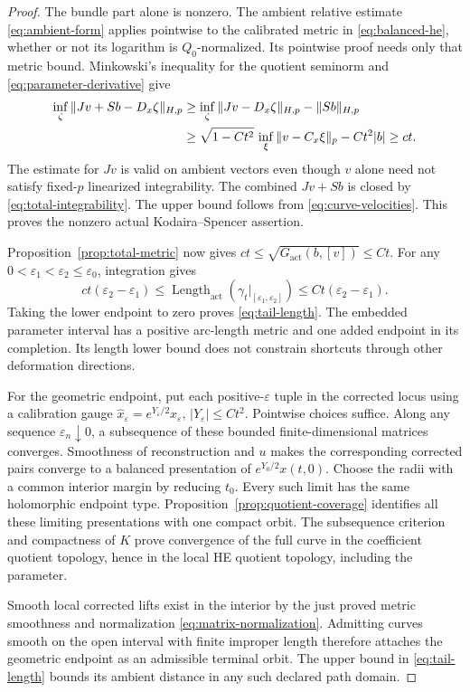 \documentclass[11pt]{amsart}
\theoremstyle{definition}
\theoremstyle{remark}
\begin{document}
\begin{proof}
The bundle part alone is nonzero. The ambient relative estimate
\eqref{eq:ambient-form} applies pointwise to the calibrated metric
in \eqref{eq:balanced-he}, whether or not its logarithm is
$Q_0$-normalized. Its pointwise proof needs only that metric bound.
Minkowski's inequality for the quotient seminorm and
\eqref{eq:parameter-derivative} give
\begin{align}
 \inf_\zeta\|Jv+Sb-D_x\zeta\|_{H,p}
 &\ge \inf_\zeta\|Jv-D_x\zeta\|_{H,p}-\|Sb\|_{H,p}\notag\\
 &\ge\sqrt{1-Ct^2}\,
       \inf_\xi\|v-C_x\xi\|_p-Ct^2|b|\ge ct.
 \label{eq:curve-ks-lower}
\end{align}
The estimate for $Jv$ is valid on ambient vectors even though $v$
alone need not satisfy fixed-$p$ linearized integrability. The combined
$Jv+Sb$ is closed by \eqref{eq:total-integrability}. The upper
bound follows from \eqref{eq:curve-velocities}. This proves the
nonzero actual Kodaira--Spencer assertion.

Proposition~\ref{prop:total-metric} now gives
$ct\le\sqrt{G_{\mathrm{act}}(b,[v])}\le Ct$.
For any $0<\varepsilon_1<\varepsilon_2\le\varepsilon_0$, integration
gives
\[
 ct(\varepsilon_2-\varepsilon_1)
 \le\operatorname{Length}_{\mathrm{act}}
       (\gamma_t|_{[\varepsilon_1,\varepsilon_2]})
 \le Ct(\varepsilon_2-\varepsilon_1).
\]
Taking the lower endpoint to zero proves \eqref{eq:tail-length}.
The embedded parameter interval has a positive arc-length metric and
one added endpoint in its completion. Its length lower bound does
not constrain shortcuts through other deformation directions.

For the geometric endpoint, put each positive-$\varepsilon$ tuple in
the corrected locus using a calibration gauge
$\widehat x_\varepsilon=e^{Y_\varepsilon/2}x_\varepsilon$,
$|Y_\varepsilon|\le Ct^2$. Pointwise choices suffice. Along any
sequence $\varepsilon_n\downarrow0$, a subsequence of these bounded
finite-dimensional matrices converges. Smoothness of reconstruction
and $u$ makes the corresponding corrected pairs converge to a balanced
presentation of $e^{Y_0/2}x(t,0)$. Choose the radii with a common
interior margin by reducing $t_0$. Every such limit has the same
holomorphic endpoint type. Proposition~\ref{prop:quotient-coverage}
identifies all these limiting presentations with one compact orbit.
The subsequence criterion and compactness of $K$ prove convergence
of the full curve in the coefficient quotient topology, hence in the
local HE quotient topology, including the parameter.

Smooth local corrected lifts exist in the interior by the just proved
metric smoothness and normalization \eqref{eq:matrix-normalization}.
Admitting curves smooth on the open interval with finite improper
length therefore attaches the geometric endpoint as an admissible
terminal orbit. The upper bound in \eqref{eq:tail-length} bounds
its ambient distance in any such declared path domain.
\end{proof}
\end{document}
